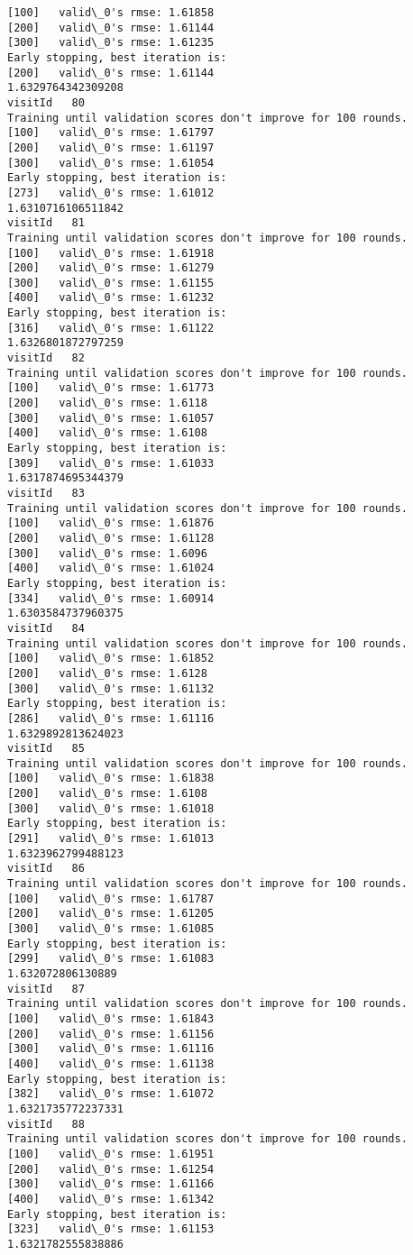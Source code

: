 \documentclass[11pt]{article}
\begin{document}
\begin{Verbatim}[commandchars=\\\{\}]
[100]	valid\_0's rmse: 1.61858
[200]	valid\_0's rmse: 1.61144
[300]	valid\_0's rmse: 1.61235
Early stopping, best iteration is:
[200]	valid\_0's rmse: 1.61144
1.6329764342309208
visitId   80
Training until validation scores don't improve for 100 rounds.
[100]	valid\_0's rmse: 1.61797
[200]	valid\_0's rmse: 1.61197
[300]	valid\_0's rmse: 1.61054
Early stopping, best iteration is:
[273]	valid\_0's rmse: 1.61012
1.6310716106511842
visitId   81
Training until validation scores don't improve for 100 rounds.
[100]	valid\_0's rmse: 1.61918
[200]	valid\_0's rmse: 1.61279
[300]	valid\_0's rmse: 1.61155
[400]	valid\_0's rmse: 1.61232
Early stopping, best iteration is:
[316]	valid\_0's rmse: 1.61122
1.6326801872797259
visitId   82
Training until validation scores don't improve for 100 rounds.
[100]	valid\_0's rmse: 1.61773
[200]	valid\_0's rmse: 1.6118
[300]	valid\_0's rmse: 1.61057
[400]	valid\_0's rmse: 1.6108
Early stopping, best iteration is:
[309]	valid\_0's rmse: 1.61033
1.6317874695344379
visitId   83
Training until validation scores don't improve for 100 rounds.
[100]	valid\_0's rmse: 1.61876
[200]	valid\_0's rmse: 1.61128
[300]	valid\_0's rmse: 1.6096
[400]	valid\_0's rmse: 1.61024
Early stopping, best iteration is:
[334]	valid\_0's rmse: 1.60914
1.6303584737960375
visitId   84
Training until validation scores don't improve for 100 rounds.
[100]	valid\_0's rmse: 1.61852
[200]	valid\_0's rmse: 1.6128
[300]	valid\_0's rmse: 1.61132
Early stopping, best iteration is:
[286]	valid\_0's rmse: 1.61116
1.6329892813624023
visitId   85
Training until validation scores don't improve for 100 rounds.
[100]	valid\_0's rmse: 1.61838
[200]	valid\_0's rmse: 1.6108
[300]	valid\_0's rmse: 1.61018
Early stopping, best iteration is:
[291]	valid\_0's rmse: 1.61013
1.6323962799488123
visitId   86
Training until validation scores don't improve for 100 rounds.
[100]	valid\_0's rmse: 1.61787
[200]	valid\_0's rmse: 1.61205
[300]	valid\_0's rmse: 1.61085
Early stopping, best iteration is:
[299]	valid\_0's rmse: 1.61083
1.632072806130889
visitId   87
Training until validation scores don't improve for 100 rounds.
[100]	valid\_0's rmse: 1.61843
[200]	valid\_0's rmse: 1.61156
[300]	valid\_0's rmse: 1.61116
[400]	valid\_0's rmse: 1.61138
Early stopping, best iteration is:
[382]	valid\_0's rmse: 1.61072
1.6321735772237331
visitId   88
Training until validation scores don't improve for 100 rounds.
[100]	valid\_0's rmse: 1.61951
[200]	valid\_0's rmse: 1.61254
[300]	valid\_0's rmse: 1.61166
[400]	valid\_0's rmse: 1.61342
Early stopping, best iteration is:
[323]	valid\_0's rmse: 1.61153
1.6321782555838886

\end{Verbatim}
\end{document}
